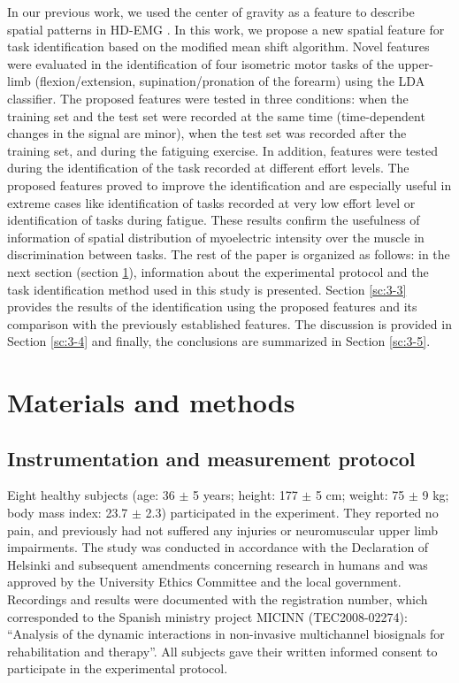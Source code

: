 In our previous work, we used the center of gravity as a feature to describe spatial patterns in HD-EMG \citep{Jordanic2016a, Jordanic2016b, Rojas-Martinez2013}. In this work, we propose a new spatial feature for task identification based on the modified mean shift algorithm. Novel features were evaluated in the identification of four isometric motor tasks of the upper-limb (flexion/extension, supination/pronation of the forearm) using the LDA classifier. The proposed features were tested in three conditions: when the training set and the test set were recorded at the same time (time-dependent changes in the signal are minor), when the test set was recorded after the training set, and during the fatiguing exercise. In addition, features were tested during the identification of the task recorded at different effort levels. The proposed features proved to improve the identification and are especially useful in extreme cases like identification of tasks recorded at very low effort level or identification of tasks during fatigue. These results confirm the usefulness of information of spatial distribution of myoelectric intensity over the muscle in discrimination between tasks.
The rest of the paper is organized as follows: in the next section (section \ref{sc:3-2}), information about the experimental protocol and the task identification method used in this study is presented. Section \ref{sc:3-3} provides the results of the identification using the proposed features and its comparison with the previously established features. The discussion is provided in Section \ref{sc:3-4} and finally, the conclusions are summarized in Section \ref{sc:3-5}.\\
\clearpage

\section{Materials and methods} \label{sc:3-2}

\subsection{Instrumentation and measurement protocol}

Eight healthy subjects (age: 36 $\pm$ 5 years; height: 177 $\pm$ 5 cm; weight: 75 $\pm$ 9 kg; body mass index: 23.7 $\pm$ 2.3) participated in the experiment. They reported no pain, and previously had not suffered any injuries or neuromuscular upper limb impairments. The study was conducted in accordance with the Declaration of Helsinki and subsequent amendments concerning research in humans and was approved by the University Ethics Committee and the local government. Recordings and results were documented with the registration number, which corresponded to the Spanish ministry project MICINN (TEC2008-02274): “Analysis of the dynamic interactions in non-invasive multichannel biosignals for rehabilitation and therapy”. All subjects gave their written informed consent to participate in the experimental protocol.

